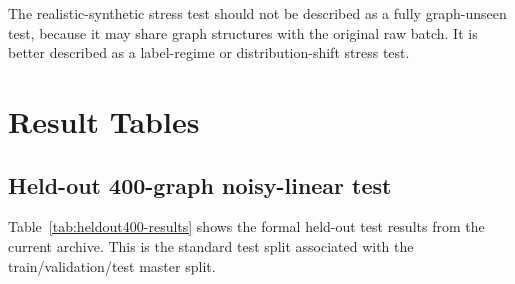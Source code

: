 The realistic-synthetic stress test should not be described as a fully
graph-unseen test, because it may share graph structures with the original raw
batch. It is better described as a label-regime or distribution-shift stress
test.

\section{Result Tables}

\subsection{Held-out 400-graph noisy-linear test}

Table~\ref{tab:heldout400-results} shows the formal held-out test results from
the current archive. This is the standard test split associated with the
train/validation/test master split.

\begin{table}[h]
\centering
\caption{Held-out 400-graph noisy-linear test results. Positive paired
improvement means e2e has a smaller decision gap than 2stage on the same test
graphs.}
\label{tab:heldout400-results}
\end{table}

